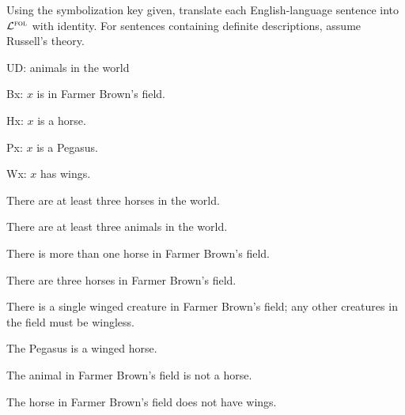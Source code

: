 \problempart Using the symbolization key given, translate each English-language sentence into $\mathcal{L}^{\textsc{fol}}$ with identity. For sentences containing definite descriptions, assume Russell's theory.
\begin{ekey}
\item[UD:] animals in the world
\item[Bx:] $x$ is in Farmer Brown's field.
\item[Hx:] $x$ is a horse.
\item[Px:] $x$ is a Pegasus.
\item[Wx:] $x$ has wings.
\end{ekey}
\begin{earg}
\item There are at least three horses in the world.
\item There are at least three animals in the world.
\item There is more than one horse in Farmer Brown's field.
\item There are three horses in Farmer Brown's field.
\item There is a single winged creature in Farmer Brown's field; any other creatures in the field must be wingless.
\item The Pegasus is a winged horse.
\item The animal in Farmer Brown's field is not a horse.
\item The horse in Farmer Brown's field does not have wings.
\end{earg}

